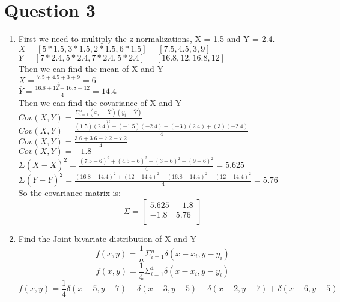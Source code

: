 \documentclass{article}
\begin{document}
\section*{Question 3}
\begin{enumerate}[label=\alph*)]
    \item First we need to multiply the z-normalizations, X = 1.5 and Y = 2.4.
    \\ $X = [5*1.5, 3*1.5, 2*1.5, 6*1.5] = [7.5, 4.5, 3, 9]$
    \\ $Y = [7*2.4, 5*2.4, 7*2.4, 5*2.4] = [16.8, 12, 16.8, 12]$
    \\ Then we can find the mean of X and Y
    \\ $\overline{X} = \frac{7.5+4.5+3+9}{4} = 6$
    \\ $\overline{Y} = \frac{16.8+12+16.8+12}{4} = 14.4$
    \\ Then we can find the covariance of X and Y
    \\ $Cov(X,Y) = \frac{\Sigma_{i=1}^{n} (x_i - \overline{X})(y_i - \overline{Y})}{n}$
    \\ $Cov(X,Y) = \frac{(1.5)(2.4) + (-1.5)(-2.4) + (-3)(2.4) + (3)(-2.4)}{4}$
    \\ $Cov(X,Y) = \frac{3.6 + 3.6 - 7.2 - 7.2}{4}$
    \\ $Cov(X,Y) = -1.8$
    \\$\Sigma (X-\overline{X})^2 = \frac{(7.5-6)^2 + (4.5-6)^2 + (3-6)^2 + (9-6)^2}{4} = 5.625$
    \\$\Sigma (Y-\overline{Y})^2 = \frac{(16.8-14.4)^2 + (12-14.4)^2 + (16.8-14.4)^2 + (12-14.4)^2}{4} = 5.76$
    \\So the covariance matrix is:
    \[
        \Sigma = 
        \begin{bmatrix}
            5.625& -1.8 \\
            -1.8 & 5.76 \\
        \end{bmatrix}
    \]
    \item Find the Joint bivariate distribution of X and Y
    \[
        f(x,y) = \frac{1}{n} \Sigma_{i=1}^{n} \delta(x-x_i, y-y_i)
    \]
    \[
        f(x,y) = \frac{1}{4} \Sigma_{i=1}^{4} \delta(x-x_i, y-y_i)
    \]
    \[
        f(x,y) = \frac{1}{4} \delta(x-5, y-7) + \delta(x-3, y-5) + \delta(x-2, y-7) + \delta(x-6, y-5)
    \]
\end{enumerate}
\end{document}
